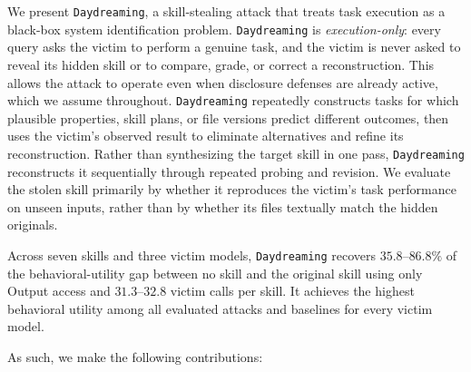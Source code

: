 \documentclass[letterpaper,twocolumn,10pt]{article}
\newcommand{\method}{\texttt{Daydreaming}\xspace}
\begin{document}
We present \method, a skill-stealing attack that treats task execution as a black-box system identification problem. 
\method is \emph{execution-only}: every query asks the victim to perform a genuine task, and the victim is never asked to reveal its hidden skill or to compare, grade, or correct a reconstruction. 
This allows the attack to operate even when disclosure defenses are already active, which we assume throughout.
\method repeatedly constructs tasks for which plausible properties, skill plans, or file versions predict different outcomes, then uses the victim’s observed result to eliminate alternatives and refine its reconstruction. 
Rather than synthesizing the target skill in one pass, \method reconstructs it sequentially through repeated probing and revision. 
We evaluate the stolen skill primarily by whether it reproduces the victim’s task performance on unseen inputs, rather than by whether its files textually match the hidden originals.

Across seven skills and three victim models, \method recovers $35.8$--$86.8\%$ of the behavioral-utility gap between no skill and the
original skill using only Output access and $31.3$--$32.8$ victim calls per
skill.  It achieves the highest behavioral utility among all evaluated attacks
and baselines for every victim model.

As such, we make the following contributions:
\end{document}
